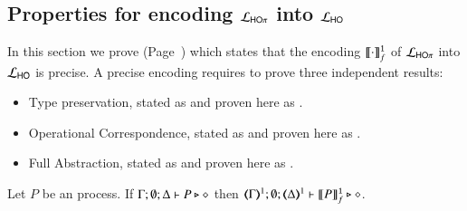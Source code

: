 
\subsection{Properties for encoding $\mathcal{L}_{\mathsf{HO}\pi}$ into $\mathcal{L}_{\mathsf{HO}}$}
\label{app:enc_HOp_to_HO}


In this section we prove  (Page~\pageref{f:enc:hopitoho})
which states that the encoding $\llbracket\cdot\rrbracket^\mathtt{1}_f$ of 
$\mathcal{L}_{\mathsf{HO}\pi}$ into $\mathcal{L}_{\mathsf{HO}}$ is precise.
A precise encoding requires to prove three independent results:
\begin{itemize}
	\item	Type preservation, stated as 
	and proven here as  .
	\item	Operational Correspondence, 
	stated as  and proven here as
	  .
	\item	Full Abstraction, stated as  and proven here as .
\end{itemize}


\begin{proposition}
	\label{app:prop:typepres_HOp_to_HO}
	Let $P$ be an \HOp process.
	If $\Gamma; \emptyset; \Delta \vdash P \triangleright \diamond$ then 
	$\mapt{\Gamma}^{1}; \emptyset; \mapt{\Delta}^{1} \proves \pmapp{P}{1}{f} \hastype \Proc$. 
\end{proposition}


